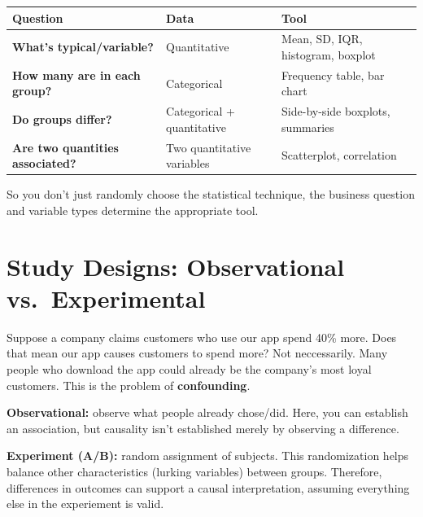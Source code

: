 \documentclass[
  letterpaper,
  DIV=11,
  numbers=noendperiod]{scrreprt}
\newcounter{none} %
\begin{document}
{\def\LTcaptype{none} %
\begin{longtable}[]{@{}
  >{\raggedright\arraybackslash}p{}
  >{\raggedright\arraybackslash}p{}
  >{\raggedright\arraybackslash}p{}@{}}
\toprule\noalign{}
\begin{minipage}[b]{\linewidth}\raggedright
Question
\end{minipage} & \begin{minipage}[b]{\linewidth}\raggedright
Data
\end{minipage} & \begin{minipage}[b]{\linewidth}\raggedright
Tool
\end{minipage} \\
\midrule\noalign{}
\endhead
\bottomrule\noalign{}
\endlastfoot
\textbf{What's typical/variable?} & Quantitative & Mean, SD, IQR,
histogram, boxplot \\
\textbf{How many are in each group?} & Categorical & Frequency table,
bar chart \\
\textbf{Do groups differ?} & Categorical + quantitative & Side-by-side
boxplots, summaries \\
\textbf{Are two quantities associated?} & Two quantitative variables &
Scatterplot, correlation \\
\end{longtable}
}

So you don't just randomly choose the statistical technique, the
business question and variable types determine the appropriate tool.

\section{Study Designs: Observational
vs.~Experimental}\label{study-designs-observational-vs.-experimental}

Suppose a company claims customers who use our app spend 40\% more. Does
that mean our app causes customers to spend more? Not neccessarily. Many
people who download the app could already be the company's most loyal
customers. This is the problem of \textbf{confounding}.

\textbf{Observational:} observe what people already chose/did. Here, you
can establish an association, but causality isn't established merely by
observing a difference.

\textbf{Experiment (A/B):} random assignment of subjects. This
randomization helps balance other characteristics (lurking variables)
between groups. Therefore, differences in outcomes can support a causal
interpretation, assuming everything else in the experiement is valid.
\end{document}
